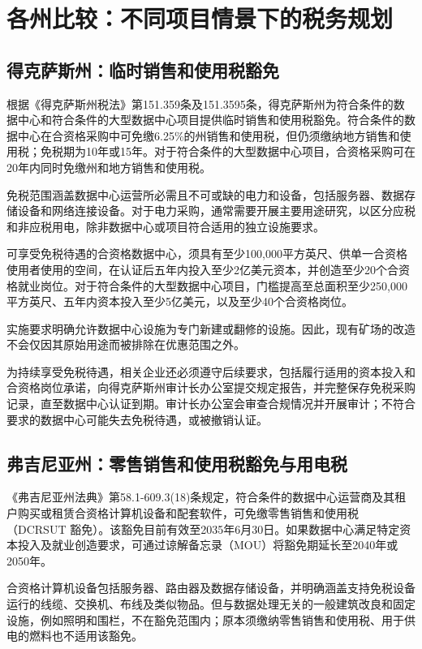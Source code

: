 \section{各州比较：不同项目情景下的税务规划}

\subsection{得克萨斯州：临时销售和使用税豁免}

根据《得克萨斯州税法》第151.359条及151.3595条，得克萨斯州为符合条件的数据中心和符合条件的大型数据中心项目提供临时销售和使用税豁免。符合条件的数据中心在合资格采购中可免缴6.25\%的州销售和使用税，但仍须缴纳地方销售和使用税；免税期为10年或15年。对于符合条件的大型数据中心项目，合资格采购可在20年内同时免缴州和地方销售和使用税。

免税范围涵盖数据中心运营所必需且不可或缺的电力和设备，包括服务器、数据存储设备和网络连接设备。对于电力采购，通常需要开展主要用途研究，以区分应税和非应税用电，除非数据中心或项目符合适用的独立设施要求。



可享受免税待遇的合资格数据中心，须具有至少100,000平方英尺、供单一合资格使用者使用的空间，在认证后五年内投入至少2亿美元资本，并创造至少20个合资格就业岗位。对于符合条件的大型数据中心项目，门槛提高至总面积至少250,000平方英尺、五年内资本投入至少5亿美元，以及至少40个合资格岗位。

实施要求明确允许数据中心设施为专门新建或翻修的设施。因此，现有矿场的改造不会仅因其原始用途而被排除在优惠范围之外。

为持续享受免税待遇，相关企业还必须遵守后续要求，包括履行适用的资本投入和合资格岗位承诺，向得克萨斯州审计长办公室提交规定报告，并完整保存免税采购记录，直至数据中心认证到期。审计长办公室会审查合规情况并开展审计；不符合要求的数据中心可能失去免税待遇，或被撤销认证。

\subsection{弗吉尼亚州：零售销售和使用税豁免与用电税}

《弗吉尼亚州法典》第58.1-609.3(18)条规定，符合条件的数据中心运营商及其租户购买或租赁合资格计算机设备和配套软件，可免缴零售销售和使用税（DCRSUT 豁免）。该豁免目前有效至2035年6月30日。如果数据中心满足特定资本投入及就业创造要求，可通过谅解备忘录（MOU）将豁免期延长至2040年或2050年。

合资格计算机设备包括服务器、路由器及数据存储设备，并明确涵盖支持免税设备运行的线缆、交换机、布线及类似物品。但与数据处理无关的一般建筑改良和固定设施，例如照明和围栏，不在豁免范围内；原本须缴纳零售销售和使用税、用于供电的燃料也不适用该豁免。

